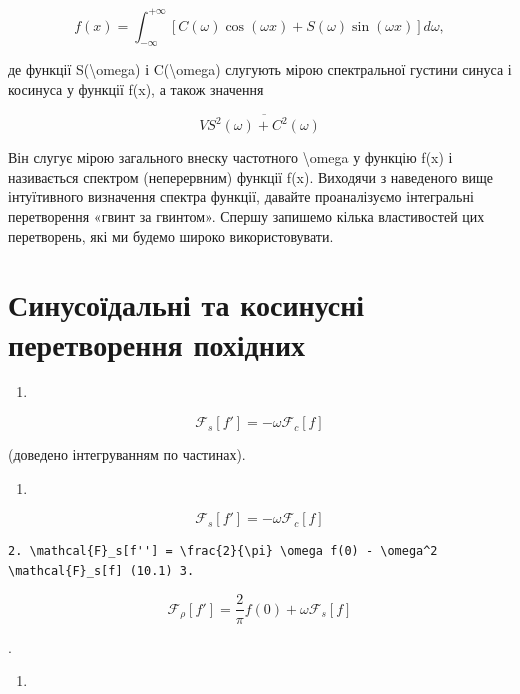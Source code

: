 \documentclass[
]{article}
\providecommand{\tightlist}{%
  \setlength{\itemsep}{0pt}\setlength{\parskip}{0pt}}
\begin{document}
\[
f(x) = \int_{-\infty}^{+\infty} [C(\omega)\cos(\omega x) + S(\omega)\sin(\omega x)] d\omega,
\]

де функції S(\textbackslash omega) і C(\textbackslash omega) слугують
мірою спектральної густини синуса і косинуса у функції f(x), а також
значення

\[
V \overline{S^2(\omega) + C^2(\omega)}
\]

Він слугує мірою загального внеску частотного \textbackslash omega у
функцію f(x) і називається спектром (неперервним) функції f(x). Виходячи
з наведеного вище інтуїтивного визначення спектра функції, давайте
проаналізуємо інтегральні перетворення «гвинт за гвинтом». Спершу
запишемо кілька властивостей цих перетворень, які ми будемо широко
використовувати.

\section{Синусоїдальні та косинусні перетворення
похідних}\label{ux441ux438ux43dux443ux441ux43eux457ux434ux430ux43bux44cux43dux456-ux442ux430-ux43aux43eux441ux438ux43dux443ux441ux43dux456-ux43fux435ux440ux435ux442ux432ux43eux440ux435ux43dux43dux44f-ux43fux43eux445ux456ux434ux43dux438ux445}

\begin{enumerate}
\def\labelenumi{\arabic{enumi}.}
\tightlist
\item
\end{enumerate}

\[
\mathcal{F}_s[f'] = -\omega \mathcal{F}_c[f]
\]

(доведено інтегруванням по частинах).

\begin{enumerate}
\def\labelenumi{\arabic{enumi}.}
\tightlist
\item
\end{enumerate}

\[
\mathcal{F}_s[f'] = -\omega \mathcal{F}_c[f]
\]

\begin{verbatim}
2. \mathcal{F}_s[f''] = \frac{2}{\pi} \omega f(0) - \omega^2 \mathcal{F}_s[f] (10.1) 3.
\end{verbatim}

\[
\mathcal{F}_{\rho}[f'] = \frac{2}{\pi} f(0) + \omega \mathcal{F}_{s}[f]
\]

.

\begin{enumerate}
\def\labelenumi{\arabic{enumi}.}
\setcounter{enumi}{3}
\tightlist
\item
\end{enumerate}
\end{document}

